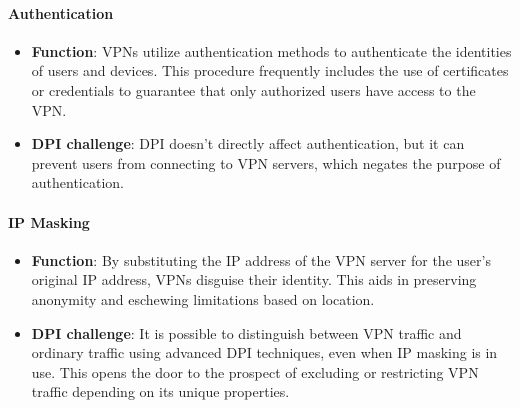 \documentclass[12pt, fleqn, a4paper]{article}
\begin{document}
\paragraph{Authentication}
\begin{itemize}
  \item \textbf{Function}: VPNs utilize authentication methods to authenticate the identities of users and devices. This procedure frequently includes the use of certificates or credentials to guarantee that only authorized users have access to the VPN.
  \item \textbf{DPI challenge}: DPI doesn't directly affect authentication, but it can prevent users from connecting to VPN servers, which negates the purpose of authentication.
\end{itemize}

\paragraph{IP Masking}
\begin{itemize}
  \item \textbf{Function}: By substituting the IP address of the VPN server for the user's original IP address, VPNs disguise their identity. This aids in preserving anonymity and eschewing limitations based on location.
  \item \textbf{DPI challenge}: It is possible to distinguish between VPN traffic and ordinary traffic using advanced DPI techniques, even when IP masking is in use. This opens the door to the prospect of excluding or restricting VPN traffic depending on its unique properties.
\end{itemize}


\end{document}
